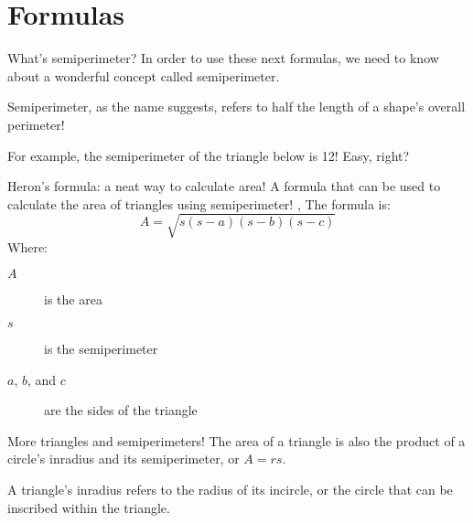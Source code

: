 \section{Formulas}
\begin{namedframe}{What's semiperimeter?}
	In order to use these next formulas, we need to know about a wonderful concept called semiperimeter.

	Semiperimeter, as the name suggests, refers to half the length of a shape's overall perimeter!

	For example, the semiperimeter of the triangle below is 12! Easy, right?
	\begin{center}
	\end{center}
\end{namedframe}
\begin{namedframe}{Heron's formula: a neat way to calculate area!}
	A formula that can be used to calculate the area of triangles using semiperimeter!
	\sep
	The formula is:
	\[A = \sqrt{s(s - a)(s-b)(s-c)}\]
	Where:
	\begin{description}
		\item[$A$] is the area
		\item[$s$] is the semiperimeter
		\item[$a$, $b$, and $c$] are the sides of the triangle
	\end{description}
\end{namedframe}
\begin{namedframe}{More triangles and semiperimeters!}
	The area of a triangle is also the product of a circle's inradius and its semiperimeter, or $A=rs$.

	A triangle's inradius refers to the radius of its incircle, or the circle that can be inscribed within the triangle.
	\begin{center}
	\end{center}
\end{namedframe}
